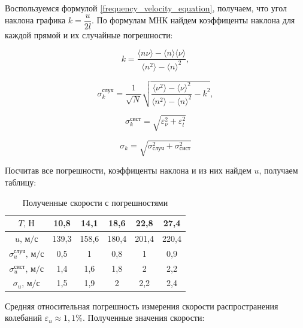 \documentclass[a4paper,12pt]{article}
\begin{document}
	Воспользуемся формулой \eqref{frequency_velocity_equation}, получаем, что угол наклона графика $k = \dfrac{u}{2l}$. По формулам МНК найдем коэффиценты наклона для каждой прямой и их случайные погрешности:
	
	\begin{equation}
		k=\frac{\langle n\nu\rangle-\langle n\rangle \langle \nu\rangle}{\langle n^2\rangle - \langle n\rangle^2},
	\end{equation}

	\begin{equation}
		\sigma_k^\text{случ}=\frac{1}{\sqrt{N}}\sqrt{\frac{\langle \nu^2 \rangle - \langle \nu \rangle^2}{\langle n^2 \rangle - \langle n \rangle^2} - k^2  },
	\end{equation}
	
	\begin{equation}
		\sigma_k^{\text{сист}} = \sqrt{ \varepsilon_\nu^2 + \varepsilon_l^2 }
	\end{equation}

	\begin{equation}
		\sigma_k = \sqrt{\sigma_\text{случ}^2 + \sigma_\text{сист}^2}
	\end{equation}

	Посчитав все погрешности, коэффиценты наклона и из них найдем $u$, получаем таблицу:
	
	\begin{table}[H]
		\begin{center}
			\begin{tabular}{|c|c|c|c|c|c|}
				\hline
				$T\text{, Н}$ & 10,8&14,1& 18,6&22,8&27,4\\
				\hline
				$u\text{, м/с}$  & 139,3 & 158,6 & 180,4 & 201,4 & 220,4 \\ \hline
				$\sigma_{u}^{\text{случ}} \text{, м/с}$     & 0,5   & 1   & 0,8   & 1   & 0,9    \\ \hline
				$\sigma_{u}^{\text{сист}} \text{, м/с}$ & 1,4  & 1,6 & 1,8   & 2   & 2,2     \\ \hline
				$\sigma_{u} \text{, м/с}$ & 1,5   & 1,9   & 2   & 2,2   & 2,4    \\ \hline
			\end{tabular}
		\caption{Полученные скорости с погрешностями}
		\end{center}
	\end{table}

	Средняя относительная погрешность измерения скорости распространения колебаний $\varepsilon_u \approx 1,1\% $. Полученные значения скорости:
	
\end{document}
